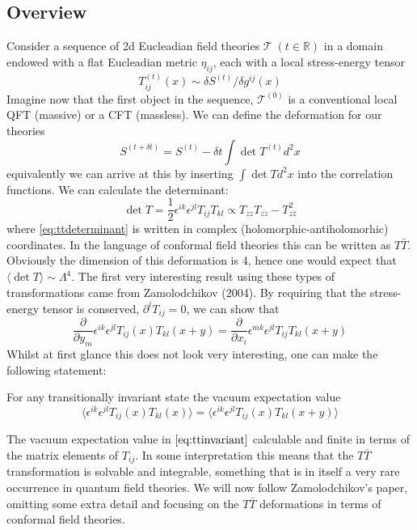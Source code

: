 \subsection{Overview}
Consider a sequence of 2d Eucleadian field theories
$\mathcal{T}\;(t\in\mathbb{R})$ in a domain endowed with a flat Eucleadian
metric $\eta_{ij}$, each with a local stress-energy tensor
\begin{equation}
  T_{ij}^{(t)}(x)\sim \delta S^{(t)}/ \delta g^{ij}(x)
\end{equation}
Imagine now that the first object in the sequence, $\mathcal{T}^{(0)}$ is
a conventional local QFT (massive) or a CFT (massless). We can define the
deformation for our theories
\begin{equation}
  S^{(t+\delta t)} = S^{(t)} - \delta t\int{\det T^{(t)} d^2 x}
\end{equation}
equivalently we can arrive at this by inserting $\int\det Td^2x$ into the
correlation functions. We can calculate the determinant:
\begin{equation}
  \det T = \frac{1}{2}\epsilon^{ik}\epsilon^{jl} T_{ij}T_{kl} \propto
  T_{zz}T_{\bar{zz}} - T^2_{z\bar{z}}
  \label{eq:ttdeterminant}
\end{equation}
where \eqref{eq:ttdeterminant} is written in complex
(holomorphic-antiholomorhic) coordinates. In the language of conformal field
theories this can be written as $T\bar{T}$. Obviously the dimension of this
deformation is 4, hence one would expect that $\langle \det T\rangle \sim
\Lambda^4$. The first very interesting result using these types of
transformations came from Zamolodchikov (2004). By requiring that the
stress-energy tensor is conserved, $\partial^i T_{ij} =0$, we can show that
\begin{equation}
  \frac{\partial}{\partial y_m}\epsilon^{ik}\epsilon^{jl}T_{ij}(x)T_{kl}(x+y)
  = \frac{\partial}{\partial x_i}\epsilon^{mk}\epsilon^{jl}T_{ij}T_{kl}(x+y)
\end{equation}
Whilst at first glance this does not look very interesting, one can make the
following statement:
\begin{tcolorbox}
  For any transitionally invariant state the vacuum expectation value
  \begin{equation}
    \langle \epsilon^{ik}\epsilon^{jl}T_{ij}(x)T_{kl}(x)\rangle = \langle
    \epsilon^{ik}\epsilon^{jl}T_{ij}(x)T_{kl}(x+y)\rangle
    \label{eq:ttinvariant}
  \end{equation}
\end{tcolorbox}
The vacuum expectation value in $\eqref{eq:ttinvariant}$ calculable and finite
in terms of the matrix elements of $T_{ij}$. In some interpretation this means
that the $T\bar{T}$ transformation is solvable and integrable, something that
is in itself a very rare occurrence in quantum field theories. We will now
follow Zamolodchikov's paper, omitting some extra detail and focusing on the
$T\bar{T}$ deformations in terms  of conformal field theories.

